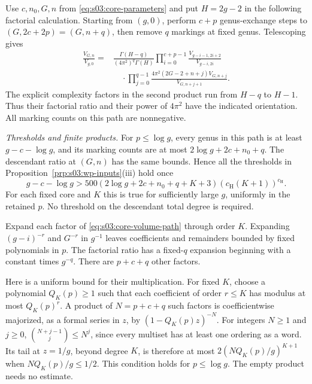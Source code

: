 \begin{prf}
Use $c,n_0,G,n$ from \eqref{eq:s03:core-parameters} and put
$H=2g-2$ in the following factorial calculation.
Starting from $(g,0)$, perform $c+p$ genus-exchange steps to
$(G,2c+2p)=(G,n+q)$, then remove $q$ markings at fixed genus.
Telescoping gives
\begin{equation}
\label{eq:s03:core-volume-path}
\begin{split}
\frac{V_{G,n}}{V_{g,0}}
={}&\frac{\Gamma(H-q)}{(4\pi^2)^q\Gamma(H)}
 \prod_{i=0}^{c+p-1}\frac{V_{g-i-1,2i+2}}{V_{g-i,2i}}\\
&\quad\cdot\prod_{j=0}^{q-1}
 \frac{4\pi^2(2G-2+n+j)V_{G,n+j}}{V_{G,n+j+1}}.
\end{split}
\end{equation}
The explicit complexity factors in the second product run from
$H-q$ to $H-1$. Thus their factorial ratio and their power of
$4\pi^2$ have the indicated orientation. All marking counts
on this path are nonnegative.

\smallskip\noindent
\emph{Thresholds and finite products.}
For $p\leq\log g$, every genus in this path is at least
$g-c-\log g$, and its marking counts are at most
$2\log g+2c+n_0+q$. The descendant ratio at $(G,n)$ has the same
bounds. Hence all the thresholds in
Proposition~\ref{prp:s03:wp-inputs}\textup{(iii)} hold once
\[
g-c-\log g>
500(2\log g+2c+n_0+q+K+3)
       (c_{\mathrm H}(K+1))^{c_{\mathrm H}}.
\]
For each fixed core and $K$ this is true for sufficiently large $g$,
uniformly in the retained $p$. No threshold on the descendant
total degree is required.

Expand each factor of \eqref{eq:s03:core-volume-path} through
order $K$. Expanding $(g-i)^{-r}$ and $G^{-r}$ in $g^{-1}$ leaves
coefficients and remainders bounded by fixed polynomials in $p$.
The factorial ratio has a fixed-$q$ expansion beginning with a
constant times $g^{-q}$. There are $p+c+q$ other factors.

Here is a uniform bound for their multiplication. For fixed $K$,
choose a polynomial $Q_K(p)\geq1$ such that each coefficient of
order $r\leq K$ has modulus at most $Q_K(p)^r$.
A product of $N=p+c+q$ such factors is coefficientwise majorized,
as a formal series in $z$, by $(1-Q_K(p)z)^{-N}$. For integers
$N\geq1$ and $j\geq0$,
$\binom{N+j-1}{j}\leq N^j$, since every multiset has at least one
ordering as a word. Its tail at $z=1/g$, beyond degree $K$, is
therefore at most $2(NQ_K(p)/g)^{K+1}$ when
$NQ_K(p)/g\leq1/2$. This condition holds for $p\leq\log g$.
The empty product needs no estimate.


\end{prf}
